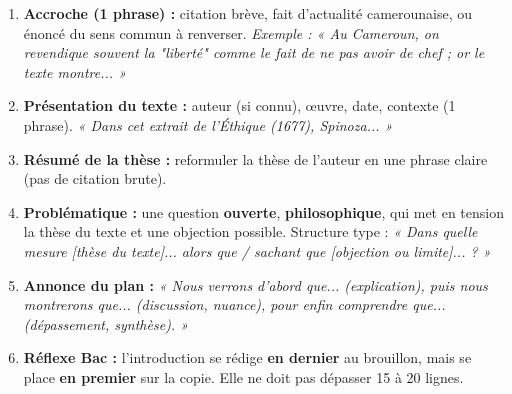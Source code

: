 \documentclass[11pt]{article}
\begin{document}
\begin{methode}
\begin{enumerate}
    \item \textbf{Accroche (1 phrase) :} citation brève, fait d'actualité camerounaise, ou énoncé du sens commun à renverser. \emph{Exemple : « Au Cameroun, on revendique souvent la "liberté" comme le fait de ne pas avoir de chef ; or le texte montre... »}
    \item \textbf{Présentation du texte :} auteur (si connu), œuvre, date, contexte (1 phrase). \emph{« Dans cet extrait de l'\emph{Éthique} (1677), Spinoza... »}
    \item \textbf{Résumé de la thèse :} reformuler la thèse de l'auteur en une phrase claire (pas de citation brute).
    \item \textbf{Problématique :} une question \textbf{ouverte}, \textbf{philosophique}, qui met en tension la thèse du texte et une objection possible. Structure type : \emph{« Dans quelle mesure [thèse du texte]... alors que / sachant que [objection ou limite]... ? »}
    \item \textbf{Annonce du plan :} \emph{« Nous verrons d'abord que... (explication), puis nous montrerons que... (discussion, nuance), pour enfin comprendre que... (dépassement, synthèse). »}
    \item \textbf{Réflexe Bac :} l'introduction se rédige \textbf{en dernier} au brouillon, mais se place \textbf{en premier} sur la copie. Elle ne doit pas dépasser 15 à 20 lignes.
\end{enumerate}
\end{methode}
\end{document}
